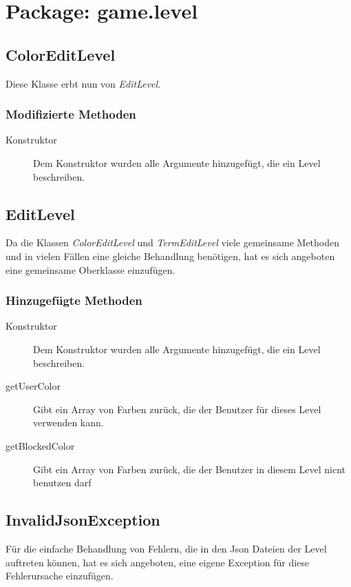 \section{Package: game.level}

\subsection{ColorEditLevel}
	Diese Klasse erbt nun von \emph{EditLevel}.

	\subsubsection{Modifizierte Methoden}
		\begin{description}
			\item[Konstruktor] Dem Konstruktor wurden alle Argumente hinzugefügt, die ein Level beschreiben.
		\end{description}


\subsection{EditLevel}
	Da die Klassen \emph{ColorEditLevel} und \emph{TermEditLevel} viele gemeinsame Methoden und in vielen Fällen 
	eine gleiche Behandlung benötigen, hat es sich angeboten eine gemeinsame Oberklasse einzufügen. 

	\subsubsection{Hinzugefügte Methoden}
		\begin{description}
			\item[Konstruktor] Dem Konstruktor wurden alle Argumente hinzugefügt, die ein Level beschreiben.
			\item[getUserColor] Gibt ein Array von Farben zurück, die der Benutzer für dieses Level verwenden kann.
			\item[getBlockedColor] Gibt ein Array von Farben zurück, die der Benutzer in diesem Level nicnt benutzen 
				darf
		\end{description}


\subsection{InvalidJsonException}
	Für die einfache Behandlung von Fehlern, die in den Json Dateien der Level auftreten können, hat es sich 
	angeboten, eine eigene Exception für diese Fehlerursache einzufügen.   

